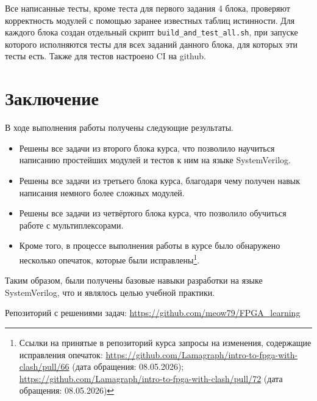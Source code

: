 \documentclass[a4paper]{article}
\begin{document}
Все написанные тесты, кроме теста для первого задания 4 блока, проверяют корректность модулей с помощью заранее известных таблиц истинности. Для каждого блока создан отдельный скрипт \verb|build_and_test_all.sh|, при запуске которого исполняются тесты для всех заданий данного блока, для которых эти тесты есть. Также для тестов настроено CI на github.

\section{Заключение}

В ходе выполнения работы получены следующие результаты.

\begin{itemize}
	\item Решены все задачи из второго блока курса, что позволило научиться написанию простейших модулей и тестов к ним на языке SystemVerilog.
    \item Решены все задачи из третьего блока курса, благодаря чему получен навык написания немного более сложных модулей.
    \item Решены все задачи из четвёртого блока курса, что позволило обучиться работе с мультиплексорами.
    \item Кроме того, в процессе выполнения работы в курсе было обнаружено несколько опечаток, которые были исправлены\footnote{Ссылки на принятые в репозиторий курса запросы на изменения, содержащие исправления опечаток: \url{https://github.com/Lamagraph/intro-to-fpga-with-clash/pull/66} (дата обращения: 08.05.2026); \url{https://github.com/Lamagraph/intro-to-fpga-with-clash/pull/72} (дата обращения: 08.05.2026)}.
\end{itemize}

Таким образом, были получены базовые навыки разработки на языке SystemVerilog, что и являлось целью учебной практики.

Репозиторий с решениями задач: \url{https://github.com/meow79/FPGA\_learning}
\end{document}
